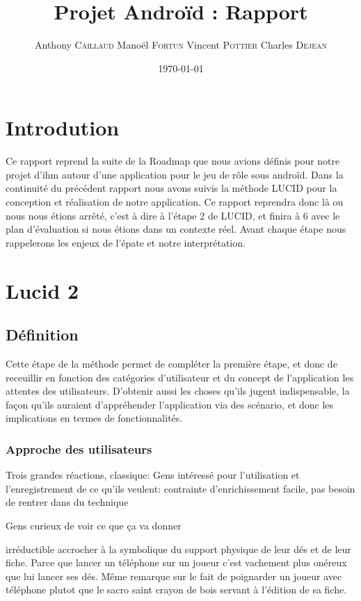 \documentclass[11pt,a4paper]{report}
\title{Projet Androïd : Rapport}
\author{Anthony \textsc{Caillaud} Manoël \textsc{Fortun} Vincent
\textsc{Pottier} Charles \textsc{Dejean}}
\date{\today}
\begin{document}
\maketitle

\clearpage
\tableofcontents
\clearpage
\section{Introdution}

Ce rapport reprend la suite de la Roadmap que nous avions définis pour notre
projet d'ihm autour d'une application pour le jeu de rôle sous androïd.
Dans la continuité du précédent rapport nous avons suivis la méthode LUCID pour
la conception et réalisation de notre application. Ce rapport reprendra donc là
ou nous nous étions arrêté, c'est à dire à l'étape 2 de LUCID, et finira à 6
avec le plan d'évaluation si nous étions dans un contexte réel.
Avant chaque étape nous rappelerons les enjeux de l'épate et notre
interprétation.

\clearpage

\section{Lucid 2}

\subsection{Définition}

Cette étape de la méthode permet de compléter la première étape, et donc de
receuillir en fonction des catégories d'utilisateur et du concept de
l'application les attentes des utilisateurs. D'obtenir aussi les choses qu'ils
jugent indispensable, la façon qu'ils auraient d'appréhender l'application via
des scénario, et donc les implications en termes de fonctionnalités.

\subsubsection{Approche des utilisateurs}


Trois grandes réactions, classique:
Gens intéressé pour l'utilisation et l'enregistrement de ce qu'ils veulent:
contrainte d'enrichissement facile, pas besoin de rentrer dans du technique


Gens curieux de voir ce que ça va donner

irréductible accrocher à la symbolique du support physique de leur dés et de
leur fiche. Parce que lancer un téléphone sur un joueur c'est vachement plus
onéreux que lui lancer ses dés. Même remarque sur le fait de poignarder un
joueur avec téléphone plutot que le sacro saint crayon de bois servant à
l'édition de sa fiche.
\end{document}
